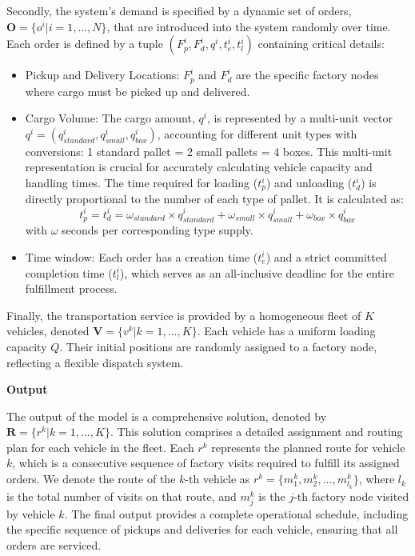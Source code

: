 \documentclass[]{interact}
\begin{document}
Secondly, the system's demand is specified by a dynamic set of orders, $\textbf{O} = \{o^i | i = 1, \dots, N\}$, that are introduced into the system randomly over time. Each order is defined by a tuple $(F_{p}^i, F_{d}^i, q^i, t_{e}^i, t_{l}^i)$ containing critical details:
\begin{itemize}
    \item Pickup and Delivery Locations: $F_{p}^i$ and $F_{d}^i$ are the specific factory nodes where cargo must be picked up and delivered.
    
    \item Cargo Volume: The cargo amount, $q^i$, is represented by a multi-unit vector $q^i = (q_{standard}^i, q_{small}^i, q_{box}^i)$, accounting for different unit types with conversions: 1 standard pallet = 2 small pallets = 4 boxes. This multi-unit representation is crucial for accurately calculating vehicle capacity and handling times. The time required for loading ($t_p^i$) and unloading ($t_d^i$) is directly proportional to the number of each type of pallet. It is calculated as:
\begin{equation}
t_p^i = t_d^i = \omega_{standard} \times q_{standard}^i 
+ \omega_{small} \times q_{small}^i 
+ \omega_{box} \times q_{box}^i
\end{equation}
    with $\omega$ seconds per corresponding type supply. 
    
    \item Time window: Each order has a creation time ($t_{e}^i$) and a strict committed completion time ($t_{l}^i$), which serves as an all-inclusive deadline for the entire fulfillment process.
\end{itemize}

Finally, the transportation service is provided by a homogeneous fleet of $K$ vehicles, denoted $\textbf{V} = \{v^k | k = 1, \dots, K\}$. Each vehicle has a uniform loading capacity $Q$. Their initial positions are randomly assigned to a factory node, reflecting a flexible dispatch system. 

\textbf{Output}

The output of the model is a comprehensive solution, denoted by $\textbf{R} = \{r^k | k = 1, \dots, K\}$. This solution comprises a detailed assignment and routing plan for each vehicle in the fleet. Each $r^k$ represents the planned route for vehicle $k$, which is a consecutive sequence of factory visits required to fulfill its assigned orders. We denote the route of the $k$-th vehicle as $r^k = \{m_1^k, m_2^k, \dots, m_{l_k}^k\}$, where $l_k$ is the total number of visits on that route, and $m_j^k$ is the $j$-th factory node visited by vehicle $k$. The final output provides a complete operational schedule, including the specific sequence of pickups and deliveries for each vehicle, ensuring that all orders are serviced.
\end{document}
